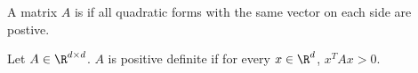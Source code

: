 


A matrix $A$ is 
if all quadratic forms with the
same vector on each side are postive.


Let $A \in \R^{d \times d}$. $A$
is positive definite if for every
$x \in \R^d$, $x^T A x > 0$.
